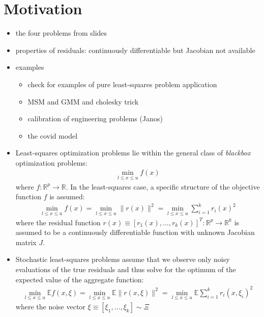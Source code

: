 
\section{Motivation}
\label{sec:motivationcd}

\begin{itemize}
    \item the four problems from slides
    \item properties of residuals: continuously differentiable but Jacobian not available
    \item examples
        \begin{itemize}
            \item check for examples of pure least-squares problem application
            \item MSM and GMM and cholesky trick
            \item calibration of engineering problems (Janos)
            \item the covid model
        \end{itemize}
\end{itemize}


\begin{itemize}
    \item Least-squares optimization problems lie within the general class of \textit{blackbox} optimization problems:
        \begin{align}
            \min\limits_{l\leq x\leq u}f(x)
            \label{eq:problem-scalar-det}
        \end{align}
    where $f:\mathbb{R}^p\rightarrow\mathbb{R}$. In the least-squares case, a specific structure of the objective function $f$ is assumed:
        \begin{align}
            \min\limits_{l\leq x\leq u}f(x)=\min\limits_{l\leq x\leq u}\lVert r(x)\rVert^2=\min\limits_{l\leq x\leq u}\sum\limits_{i=1}^kr_i(x)^2
            \label{eq:problem-ls-det}
        \end{align}
    where the residual function $r(x)\equiv[r_1(x),\dots,r_k(x)]^T:\mathbb{R}^p\rightarrow\mathbb{R}^k$ is assumed to be a continuously differentiable function with unknown Jacobian matrix $J$.
    \item Stochastic least-squares problems assume that we observe only noisy evaluations of the true residuals and thus solve for the optimum of the expected value of the aggregate function:
        \begin{align}
            \min\limits_{l\leq x\leq u}\mathbb{E}f(x,\xi)=\min\limits_{l\leq x\leq u}\mathbb{E}\lVert r(x,\xi)\rVert^2=\min\limits_{l\leq x\leq u}\mathbb{E}\sum\limits_{i=1}^kr_i(x, \xi_i)^2
            \label{eq:problem-ls-noise}
        \end{align}
    where the noise vector $\xi\equiv[\xi_1,\dots,\xi_k]\sim\Xi$
\end{itemize}
